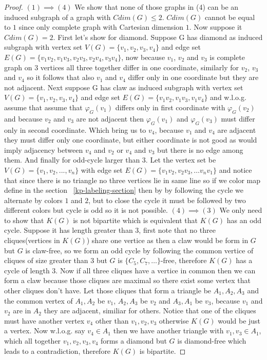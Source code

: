 \documentclass[12pt,a4paper,titlepage,openany]{report}
\begin{document}
\begin{proof}
$(1)\implies(4)$ We show that none of those graphs in (4) can be an induced subgraph of a graph with $Cdim(G)\leq 2$. $Cdim(G)$ cannot be equal to $1$ since only complete graph with Cartesian dimension $1$. Now suppose it $Cdim(G)=2$.
\newline First let's show for diamond. Suppose G has diamond as induced subgraph with vertex set $V(G)=\{v_1,v_2,v_3,v_4\}$ and edge set $E(G)=\{v_1v_2,v_1v_3,v_2v_3,v_2v_4,v_3v_4\}$, now because $v_1$, $v_2$ and $v_3$ is complete graph on $3$ vertices all three together differ in one coordinate, similarly for $v_2$, $v_3$ and $v_4$ so it follows that also $v_1$ and $v_4$ differ only in one coordinate but they are not adjacent.
\newline Next suppose G has claw as induced subgraph with vertex set $V(G)=\{v_1,v_2,v_3,v_4\}$ and edge set $E(G)=\{v_1v_2,v_1v_3,v_1v_4\}$ and w.l.o.g. assume that assume that $\varphi_G(v_1)$ differs only in first coordinate with $\varphi_G(v_2)$ and because $v_2$ and $v_3$ are not adjacent then $\varphi_G(v_1)$ and $\varphi_G(v_3)$ must differ only in second coordinate. Which bring us to $v_4$, because $v_1$ and $v_4$ are adjacent they must differ only one coordinate, but either coordinate is not good as would  imply adjacency between $v_4$ and $v_2$ or $v_4$ and $v_3$ but there is no edge among them.
\newline And finally for odd-cycle larger than 3. Let the vertex set be $V(G)=\{v_1,v_2,...,v_n\}$ with edge set $E(G)=\{v_1v_2,v_2v_3,\ldots v_nv_1\}$ and notice that since there is no triangle no three vertices lie in same line so if we color map define in the section ~\ref{kp-labeling-section} then by by following the cycle we alternate by colors $1$ and $2$, but to close the cycle it must be followed by two different colors but cycle is odd so it is not possible.\newline
$(4)\implies (3)$ We only need to show that $K(G)$ is not bipartite which is equivalent that $K(G)$ has an odd cycle. Suppose it has length greater than $3$, first note that no three cliques(vertices in $K(G)$) share one vertice as then a claw would be form in $G$ but $G$ is claw-free, so we form an odd cycle by following the common vertice of cliques of size greater than $3$ but $G$ is $\{C_5,C_7,\ldots\}$-free, therefore $K(G)$ has a cycle of length $3$. Now if all three cliques have a vertice in common then we can form a claw because those cliques are maximal so there exist some vertex that other cliques don't have. Let those cliques that form a triangle be $A_1,A_2,A_3$ and the common vertex of $A_1,A_2$ be $v_1$, $A_2,A_3$ be $v_2$ and $A_3,A_1$ be $v_3$, because $v_1$ and $v_2$ are in $A_2$ they are adjacent, similiar for others. Notice that one of the cliques must have another vertex $v_4$ other than $v_1,v_2,v_3$ otherwise $K(G)$ would be just a vertex. Now w.l.o.g. say $v_4\in A_1$ then we have another triangle with $v_1,v_3\in A_1$, which all together $v_1,v_2,v_3,v_4$ forms a diamond but $G$ is diamond-free which leads to a contradiction, therefore $K(G)$ is bipartite.\newline 

\end{proof}
\end{document}
